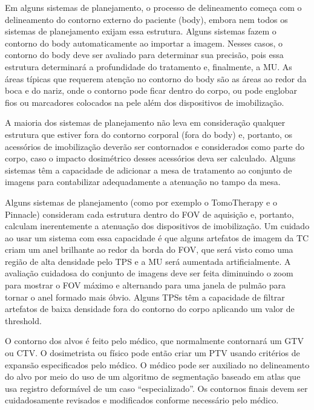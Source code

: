 \documentclass[11pt,a4paper]{article}
\newcounter{exemplo}
\begin{document}
	Em alguns sistemas de planejamento, o processo de delineamento começa com o delineamento do contorno  externo do paciente (body), embora nem todos os sistemas de planejamento exijam essa estrutura. Alguns sistemas fazem o contorno do body automaticamente ao importar a imagem. Nesses casos,  o contorno do body deve ser avaliado para determinar sua precisão, pois essa estrutura determinará a profundidade do tratamento e, finalmente, a MU. As áreas típicas que requerem atenção no contorno do body são as áreas ao redor da boca e do nariz, onde o contorno pode ficar dentro do corpo, ou pode englobar fios ou marcadores colocados na pele além dos dispositivos de imobilização. 

	A maioria dos sistemas de planejamento não leva em consideração qualquer estrutura que estiver fora do contorno corporal (fora do body) e, portanto, os acessórios de imobilização deverão ser contornados e considerados como parte do corpo, caso o impacto dosimétrico desses acessórios deva ser calculado. Alguns sistemas têm a capacidade de adicionar a mesa de tratamento ao conjunto de imagens para contabilizar adequadamente a atenuação no tampo da mesa.

	Alguns sistemas de planejamento (como por exemplo o TomoTherapy e o Pinnacle) consideram cada estrutura dentro do FOV de aquisição e, portanto, calculam inerentemente a atenuação dos dispositivos de imobilização. Um cuidado ao usar um sistema com essa capacidade é que alguns artefatos de imagem da TC criam um anel brilhante ao redor da borda do FOV, que será visto como uma região de alta densidade pelo TPS e a MU será aumentada artificialmente. A avaliação cuidadosa do conjunto de imagens deve ser feita diminuindo o zoom para mostrar o FOV máximo e alternando para uma janela de pulmão para tornar o anel formado mais óbvio. Alguns TPSs têm a capacidade de filtrar artefatos de baixa densidade fora do contorno do corpo aplicando um valor de threshold.

	O contorno dos alvos é feito pelo médico, que normalmente contornará um GTV ou CTV. O dosimetrista ou físico pode então criar um PTV usando critérios de expansão especificados pelo médico. O médico pode ser auxiliado no delineamento do alvo por meio do uso de um algoritmo de segmentação baseado em atlas que usa registro deformável de um caso “especializado”. Os contornos finais devem ser cuidadosamente revisados e modificados conforme necessário pelo médico.
\end{document}
